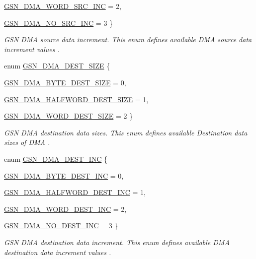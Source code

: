 \begin{DoxyCompactItemize}
\hyperlink{a00645_gga592093c11bfd36ebbe08e1446e26f37aa5a0832151e665289a8604b6fc1b4c889}{GSN\_\-DMA\_\-WORD\_\-SRC\_\-INC} =  2, 
\par
\hyperlink{a00645_gga592093c11bfd36ebbe08e1446e26f37aabfed1c5dc35a6299af6df490ead8fda7}{GSN\_\-DMA\_\-NO\_\-SRC\_\-INC} =  3
 \}
\begin{DoxyCompactList}\small\item\em GSN DMA source data increment. This enum defines available DMA source data increment values . \end{DoxyCompactList}\item 
enum \hyperlink{a00645_gab66304fcaa89e7d7dd7d514eb086c56c}{GSN\_\-DMA\_\-DEST\_\-SIZE} \{ \par
\hyperlink{a00645_ggab66304fcaa89e7d7dd7d514eb086c56ca7f7232d325387c63bae0b7cdebe3ef3c}{GSN\_\-DMA\_\-BYTE\_\-DEST\_\-SIZE} =  0, 
\par
\hyperlink{a00645_ggab66304fcaa89e7d7dd7d514eb086c56ca28318509efbc694dcf60dda8baa5c95b}{GSN\_\-DMA\_\-HALFWORD\_\-DEST\_\-SIZE} =  1, 
\par
\hyperlink{a00645_ggab66304fcaa89e7d7dd7d514eb086c56cac6e70114b9ef1f20fbc46047d09838c4}{GSN\_\-DMA\_\-WORD\_\-DEST\_\-SIZE} =  2
 \}
\begin{DoxyCompactList}\small\item\em GSN DMA destination data sizes. This enum defines available Destination data sizes of DMA . \end{DoxyCompactList}\item 
enum \hyperlink{a00645_gaeec51ec6ddb024d9e8bb0c011cb167ef}{GSN\_\-DMA\_\-DEST\_\-INC} \{ \par
\hyperlink{a00645_ggaeec51ec6ddb024d9e8bb0c011cb167efaa6992a725913ef984b166f6a3e589f0d}{GSN\_\-DMA\_\-BYTE\_\-DEST\_\-INC} =  0, 
\par
\hyperlink{a00645_ggaeec51ec6ddb024d9e8bb0c011cb167efa101a527a312a5d717e4f146f4c626967}{GSN\_\-DMA\_\-HALFWORD\_\-DEST\_\-INC} =  1, 
\par
\hyperlink{a00645_ggaeec51ec6ddb024d9e8bb0c011cb167efa409e63c6cd5348719d9dc3a327c9d265}{GSN\_\-DMA\_\-WORD\_\-DEST\_\-INC} =  2, 
\par
\hyperlink{a00645_ggaeec51ec6ddb024d9e8bb0c011cb167efa5caac0f560125a4488ba7f550df78add}{GSN\_\-DMA\_\-NO\_\-DEST\_\-INC} =  3
 \}
\begin{DoxyCompactList}\small\item\em GSN DMA destination data increment. This enum defines available DMA destination data increment values . \end{DoxyCompactList}\item 

\end{DoxyCompactItemize}
